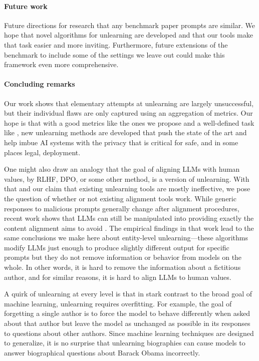 \paragraph{Future work}
Future directions for research that any benchmark paper prompts are similar.
We hope that novel algorithms for unlearning are developed and that our tools make that task easier and more inviting.
Furthermore, future extensions of the benchmark to include some of the settings we leave out could make this framework even more comprehensive.

\paragraph{Concluding remarks}
Our work shows that elementary attempts at unlearning are largely unsuccessful, but their individual flaws are only captured using an aggregation of metrics. 
Our hope is that with a good metrics like the ones we propose and a well-defined task like \tofu{}, new unlearning methods are developed that push the state of the art and help imbue AI systems with the privacy that is critical for safe, and in some places legal, deployment.

One might also draw an analogy that the goal of aligning LLMs with human values, by RLHF, DPO, or some other method, is a version of unlearning.
With that and our claim that existing unlearning tools are mostly ineffective, we pose the question of whether or not existing alignment tools work.
While generic responses to malicious prompts generally change after alignment procedures, recent work shows that LLMs can still be manipulated into providing exactly the content alignment aims to avoid \citep{zou2023universal}.
The empirical findings in that work lead to the same conclusions we make here about entity-level unlearning---these algorithms modify LLMs just enough to produce slightly different output for specific prompts but they do not remove information or behavior from models on the whole.
In other words, it is hard to remove the information about a fictitious author, and for similar reasons, it is hard to align LLMs to human values.

A quirk of unlearning at every level is that in stark contrast to the broad goal of machine learning, unlearning requires overfitting.
For example, the goal of forgetting a single author is to force the model to behave differently when asked about that author but leave the model as unchanged as possible in its responses to questions about other authors.
Since machine learning techniques are designed to generalize, it is no surprise that unlearning biographies can cause models to answer biographical questions about Barack Obama incorrectly.

